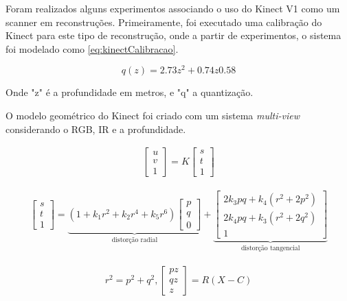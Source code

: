Foram realizados alguns experimentos associando o uso do Kinect V1 como um scanner em reconstruções. Primeiramente, foi executado uma calibração do Kinect para este tipo de reconstrução, onde a partir de experimentos, o sistema foi modelado como \ref{eq:kinectCalibracao}.

\begin{equation}
\label{eq:kinectCalibracao}
q(z)=2.73z^{2}+0.74z 0.58
\end{equation}

Onde "z" é a profundidade em metros, e "q" a quantização.

O modelo geométrico do Kinect foi criado com um sistema \emph{multi-view} considerando o RGB, IR e a profundidade.

\begin{gather} 
\label{eq:matrix}
\begin{bmatrix}
u\\
v\\
1
\end{bmatrix} 
= K
\begin{bmatrix}
s\\
t\\
1
\end{bmatrix}
\end{gather}

\begin{gather} 
\begin{bmatrix}
s\\
t\\
1
\end{bmatrix} 
= 
\underbrace{(1 + k_1r^2 + k_2r^4 + k_5r^6) 
\begin{bmatrix}
p\\
q\\
0
\end{bmatrix} }_{\text{distorção radial}} 
+
\underbrace{
\begin{bmatrix}
2k_3pq+k_4(r^2+2p^2)\\
2k_4pq+k_3(r^2+2q^2)\\
1
\end{bmatrix} }_{\text{distorção tangencial}}
\label{eq:distorcaoKinect}
\end{gather}

\begin{gather}
r^2 = p^2+q^2, 
\begin{bmatrix}
pz\\ 
qz\\ 
z
\end{bmatrix} = R(X-C)
\label{eq:relacaoKinect}
\end{gather}



